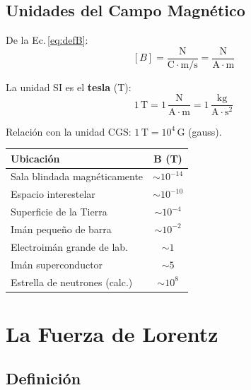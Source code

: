 \documentclass[12pt, letterpaper]{report}
\numberwithin{equation}{section}
\newcommand{\un}[1]{\,\mathrm{#1}}            %
\begin{document}
\subsection{Unidades del Campo Magnético}

De la Ec.\,\eqref{eq:defB}:
\[
  [B] = \frac{\mathrm{N}}{\mathrm{C}\cdot\mathrm{m/s}}
       = \frac{\mathrm{N}}{\mathrm{A}\cdot\mathrm{m}}
\]

La unidad SI es el \textbf{tesla} (T):
\begin{equation}
  \boxed{1\un{T} = 1\,\frac{\mathrm{N}}{\mathrm{A}\cdot\mathrm{m}}
                 = 1\,\frac{\mathrm{kg}}{\mathrm{A}\cdot\mathrm{s}^2}}
\end{equation}

Relación con la unidad CGS: $1\un{T}=10^4\un{G}$ (gauss).

\vspace{6pt}
\begin{center}
\begin{tabular}{lc}
  \toprule
  \textbf{Ubicación} & $\boldsymbol{B}$ \textbf{(T)} \\
  \midrule
  Sala blindada magnéticamente & ${\sim}10^{-14}$ \\
  Espacio interestelar         & ${\sim}10^{-10}$ \\
  Superficie de la Tierra      & ${\sim}10^{-4}$  \\
  Imán pequeño de barra        & ${\sim}10^{-2}$  \\
  Electroimán grande de lab.   & ${\sim}1$        \\
  Imán superconductor          & ${\sim}5$        \\
  Estrella de neutrones (calc.)& ${\sim}10^{8}$   \\
  \bottomrule
\end{tabular}
\end{center}

\section{La Fuerza de Lorentz}

\subsection{Definición}
\end{document}
